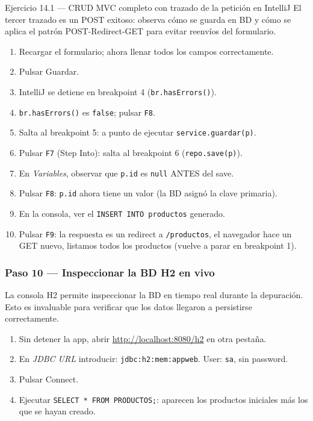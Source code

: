 \documentclass[11pt,a4paper,openany]{book}
\begin{document}
\begin{cajaejercicio}{Ejercicio 14.1 --- CRUD MVC completo con trazado de la petición en IntelliJ}
El tercer trazado es un POST exitoso: observa cómo se
guarda en BD y cómo se aplica el patrón POST-Redirect-GET para
evitar reenvíos del formulario.


\begin{enumerate}
\item Recargar el formulario; ahora llenar todos los campos
correctamente.
\item Pulsar Guardar.
\item IntelliJ se detiene en breakpoint 4 (\texttt{br.hasErrors()}).
\item \texttt{br.hasErrors()} es \texttt{false}; pulsar \texttt{F8}.
\item Salta al breakpoint 5: a punto de ejecutar
\texttt{service.guardar(p)}.
\item Pulsar \texttt{F7} (Step Into): salta al breakpoint 6
(\texttt{repo.save(p)}).
\item En \emph{Variables}, observar que \texttt{p.id} es \texttt{null}
ANTES del save.
\item Pulsar \texttt{F8}: \texttt{p.id} ahora tiene un valor (la BD
asignó la clave primaria).
\item En la consola, ver el \texttt{INSERT INTO productos} generado.
\item Pulsar \texttt{F9}: la respuesta es un redirect a
\texttt{/productos}, el navegador hace un GET nuevo, listamos
todos los productos (vuelve a parar en breakpoint 1).
\end{enumerate}

\subsubsection*{Paso 10 --- Inspeccionar la BD H2 en vivo}

La consola H2 permite inspeccionar la BD en tiempo real
durante la depuración. Esto es invaluable para verificar que los
datos llegaron a persistirse correctamente.


\begin{enumerate}
\item Sin detener la app, abrir \url{http://localhost:8080/h2} en otra
pestaña.
\item En \emph{JDBC URL} introducir: \texttt{jdbc:h2:mem:appweb}.
User: \texttt{sa}, sin password.
\item Pulsar Connect.
\item Ejecutar \texttt{SELECT * FROM PRODUCTOS;}: aparecen los
productos iniciales más los que se hayan creado.
\end{enumerate}


\end{cajaejercicio}
\end{document}
